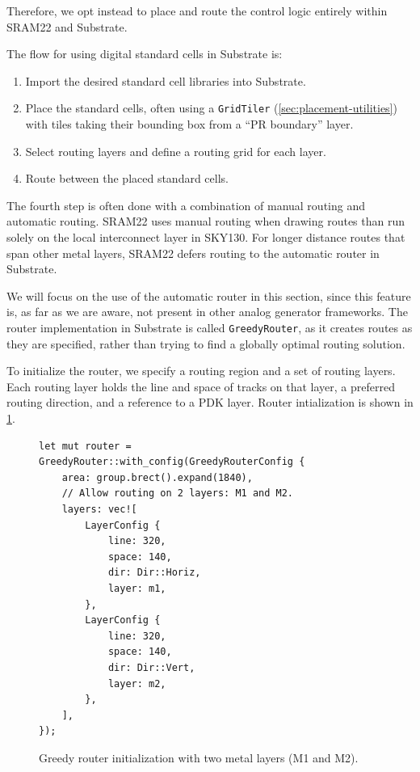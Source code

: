 Therefore, we opt instead to place and route the control logic entirely within SRAM22 and Substrate.

The flow for using digital standard cells in Substrate is:
\begin{enumerate}
\item Import the desired standard cell libraries into Substrate.
\item Place the standard cells, often using a \verb|GridTiler| (\ref{sec:placement-utilities}) with tiles taking their bounding box from a ``PR boundary'' layer.
\item Select routing layers and define a routing grid for each layer.
\item Route between the placed standard cells.
\end{enumerate}

The fourth step is often done with a combination of manual routing and automatic routing.
SRAM22 uses manual routing when drawing routes than run solely on the local interconnect layer in SKY130.
For longer distance routes that span other metal layers, SRAM22 defers routing to the automatic router in Substrate.

We will focus on the use of the automatic router in this section, since this feature is, as far as we are aware, not present
in other analog generator frameworks. The router implementation in Substrate is called \verb|GreedyRouter|, as it creates
routes as they are specified, rather than trying to find a globally optimal routing solution.

To initialize the router, we specify a routing region and a set of routing layers. Each routing layer holds the
line and space of tracks on that layer, a preferred routing direction, and a reference to a PDK layer.
Router intialization is shown in \ref{fig:greedy-router-initialization}.

\begin{figure}[H] \centering
\begin{verbatim}
let mut router = GreedyRouter::with_config(GreedyRouterConfig {
    area: group.brect().expand(1840),
    // Allow routing on 2 layers: M1 and M2.
    layers: vec![
        LayerConfig {
            line: 320,
            space: 140,
            dir: Dir::Horiz,
            layer: m1,
        },
        LayerConfig {
            line: 320,
            space: 140,
            dir: Dir::Vert,
            layer: m2,
        },
    ],
});
\end{verbatim}
\caption{Greedy router initialization with two metal layers (M1 and M2). \label{fig:greedy-router-initialization}}
\end{figure}

